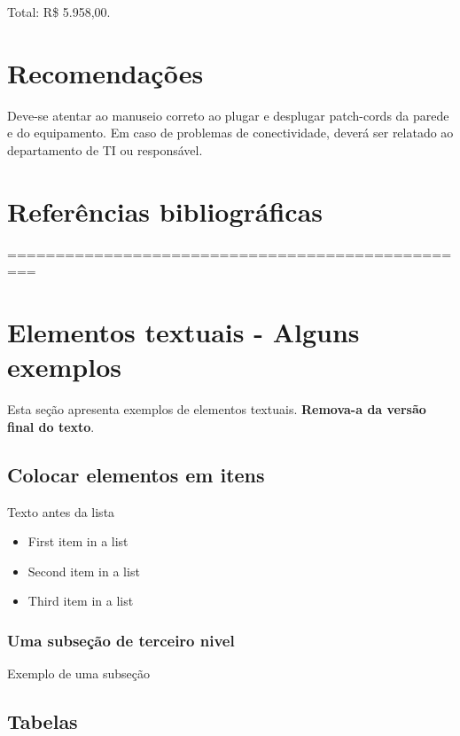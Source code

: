 \documentclass[	DIV=calc,%
							paper=a4,%
							fontsize=12pt,%
							onecolumn]{scrartcl}	 					%
\begin{document}
Total: R\$ 5.958,00.

\section{Recomendações}
Deve-se atentar ao manuseio correto ao plugar e desplugar patch-cords da parede e do equipamento. Em caso de problemas de conectividade, deverá ser relatado ao departamento de TI ou responsável.

\section{Referências bibliográficas}
\renewcommand\refname{} %

  

=================================================
\section{Elementos textuais - Alguns exemplos}

Esta seção apresenta exemplos de elementos textuais. \textbf{Remova-a da versão final do texto}.


\subsection{Colocar elementos em itens}

Texto antes da lista

\begin{itemize}
	\item First item in a list 
	\item Second item in a list 
	\item Third item in a list
\end{itemize}

\subsubsection{Uma subseção de terceiro nivel}

Exemplo de uma subseção

\subsection{Tabelas}
\end{document}
